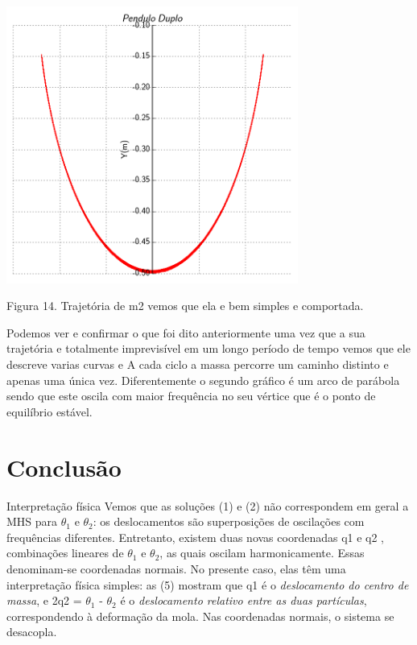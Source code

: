 \documentclass[a4paper]{article} %
\begin{document}
\begin{center}
		\includegraphics[width=3.77in,height=3.58in, keepaspectratio=false]{pendulo_duploXY2.png}
	
	\scriptsize {Figura 14. Trajetória de m2 vemos que ela e bem simples e comportada.}
\end{center}
Podemos ver e confirmar o que foi dito anteriormente uma vez que a sua trajetória e totalmente imprevisível em um longo período de tempo vemos que ele descreve varias curvas e  A cada ciclo a massa percorre um caminho distinto e apenas uma \'{u}nica vez.  Diferentemente o segundo gráfico é um arco de parábola sendo que este oscila com maior frequência no seu vértice que é o ponto de equilíbrio estável.

\section{Conclus\~{a}o}

Interpretação física 
Vemos que as soluções (1) e (2)  não correspondem em geral a MHS para $\theta_1$ e $\theta_2$: os deslocamentos são superposições de oscilações com frequências diferentes. Entretanto, existem duas novas coordenadas q1 e q2 , combinações lineares de $\theta_1$ e $\theta_2$, as quais oscilam harmonicamente. Essas denominam-se coordenadas normais. No presente caso, elas têm uma interpretação física simples: as (5) mostram que q1 é o \textit{deslocamento do centro de massa}, e 2q2 = $\theta_1$ - $\theta_2$ é o \textit{deslocamento relativo entre as duas partículas}, correspondendo à deformação da mola. Nas coordenadas normais, o sistema se desacopla. 
\end{document}
